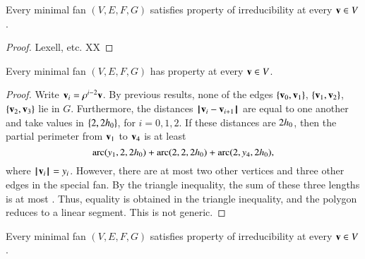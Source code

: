 
\begin{lemma}
Every minimal fan $(V,E,F,G)$ satisfies property 
of irreducibility at every ${\mathbf v}\in V$.
\end{lemma}

\begin{proof}  Lexell, etc. XX
\end{proof}









\begin{lemma}  Every minimal fan $(V,E,F,G)$ has property  at every ${\mathbf v}\in V$.
\end{lemma}

\begin{proof} Write ${\mathbf v}_i = \rho^{i-2} {\mathbf v}$.  By previous results, none of the edges $\{{\mathbf v}_0,{\mathbf v}_1\}$, $\{{\mathbf v}_1,{\mathbf v}_2\}$, $\{{\mathbf v}_2,{\mathbf v}_3\}$ lie in $G$.  Furthermore, the distances ${\hskip0.1em|\hskip-0.15em|\hskip0.1em}{\mathbf v}_i - {\mathbf v}_{i+1}{\hskip0.1em|\hskip-0.15em|\hskip0.1em}$ are equal to one another and take values in $\{2,2{h_0}\}$, for $i=0,1,2$.  
If these distances are $2{h_0}$, then the partial perimeter from ${\mathbf v}_1$ to ${\mathbf v}_4$ is at least
\begin{equation}\label{eqn:3side}
\operatorname{arc}(y_1,2,2{h_0})+\operatorname{arc}(2,2,2{h_0})+\operatorname{arc}(2,y_4,2{h_0}),
\end{equation}
where ${{\hskip0.1em|\hskip-0.15em|\hskip0.1em}{\mathbf v}_i{\hskip0.1em|\hskip-0.15em|\hskip0.1em}}=y_i$.
However, there are at most two other vertices and three other edges in the special fan.  By the triangle inequality, the sum of these three lengths is at most .
Thus, equality is obtained in the triangle inequality, and the polygon reduces to a linear segment.  This is not generic.
\end{proof}

\begin{lemma} 
Every minimal fan $(V,E,F,G)$ satisfies property  of irreducibility at every ${\mathbf v}\in V$.
%
%
\end{lemma}

